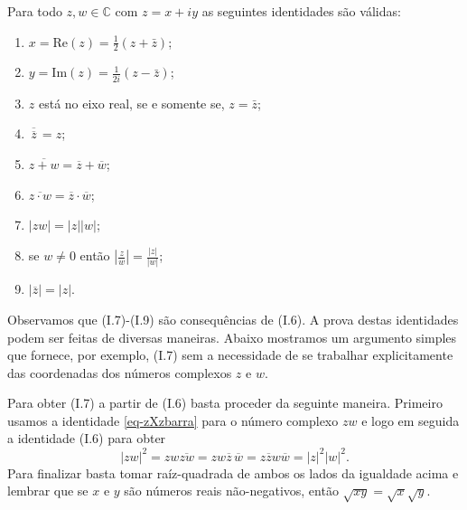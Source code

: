 \medskip 

Para todo $z,w\in \mathbb{C}$ com $z=x+iy$ as seguintes identidades são válidas:
\label{page:eq-prop-basicas-conjugado}
\begin{enumerate}[({I}.1)]
\item $x=\mathrm{Re}(z) = \frac{1}{2}(z+\bar{z})$;
\item $y= \mathrm{Im}(z) = \frac{1}{2i}(z-\bar{z})$;
\item $z$ está no eixo real, se e somente se, $z=\bar{z}$;
\item $\overline{\,\overline{z}\,}=z$;
\item $\overline{z+w}= \overline{z}+\overline{w}$;
\item $\overline{z\cdot w}=\overline{z}\cdot \overline{w}$;
\item $|zw|=|z||w|$;
\item se $w\neq 0$ então $\displaystyle \left| \frac{z}{w}\right| = \frac{|z|}{|w|}$;
\item $|\overline{z}| = |z|$.
\end{enumerate}

Observamos que (I.7)-(I.9) são consequências de (I.6). 
A prova destas identidades podem ser feitas de diversas maneiras. Abaixo mostramos
um argumento simples que fornece, por exemplo, (I.7) sem a 
necessidade de se trabalhar explicitamente das coordenadas dos
números complexos $z$ e $w$. 

Para obter (I.7) a partir de (I.6) basta proceder da seguinte maneira. 
Primeiro usamos a identidade \eqref{eq-zXzbarra} para o número complexo $zw$ e logo em seguida a 
identidade (I.6) para obter
\[
|zw|^2 
= 
zw\overline{zw} 
= 
zw\overline{z}\,\overline{w}= z\overline{z}w\overline{w} = |z|^2|w|^2.
\]
Para finalizar basta tomar raíz-quadrada de ambos os lados da igualdade acima
e lembrar que se $x$ e $y$ são números reais não-negativos, então $\sqrt{xy}=\sqrt{x}\sqrt{y}$.


